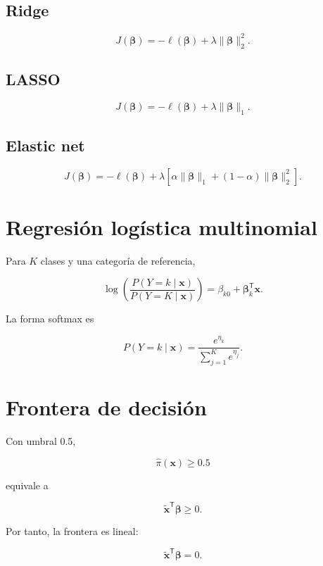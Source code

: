 \documentclass[
  spanish,
  11pt,
  letterpaper,
  DIV=11,
  numbers=noendperiod]{scrreprt}
\theoremstyle{definition}
\theoremstyle{plain}
\theoremstyle{definition}
\theoremstyle{remark}
\begin{document}
\subsection{Ridge}\label{ridge}

\[
J(\boldsymbol{\beta})
=
-\ell(\boldsymbol{\beta})
+
\lambda
\|\boldsymbol{\beta}\|_2^2.
\]

\subsection{LASSO}\label{lasso-1}

\[
J(\boldsymbol{\beta})
=
-\ell(\boldsymbol{\beta})
+
\lambda
\|\boldsymbol{\beta}\|_1.
\]

\subsection{Elastic net}\label{elastic-net-1}

\[
J(\boldsymbol{\beta})
=
-\ell(\boldsymbol{\beta})
+
\lambda
\left[
\alpha
\|\boldsymbol{\beta}\|_1
+
(1-\alpha)
\|\boldsymbol{\beta}\|_2^2
\right].
\]

\section{Regresión logística
multinomial}\label{regresiuxf3n-loguxedstica-multinomial}

Para \(K\) clases y una categoría de referencia,

\[
\log
\left(
\frac{
P(Y=k\mid\mathbf{x})
}{
P(Y=K\mid\mathbf{x})
}
\right)
=
\beta_{k0}
+
\boldsymbol{\beta}_k^{\mathsf T}\mathbf{x}.
\]

La forma softmax es

\[
P(Y=k\mid\mathbf{x})
=
\frac{
e^{\eta_k}
}{
\sum_{j=1}^{K}e^{\eta_j}
}.
\]

\section{Frontera de decisión}\label{frontera-de-decisiuxf3n-1}

Con umbral 0.5,

\[
\widehat{\pi}(\mathbf{x})\geq 0.5
\]

equivale a

\[
\widetilde{\mathbf{x}}^{\mathsf T}\boldsymbol{\beta}\geq 0.
\]

Por tanto, la frontera es lineal:

\[
\widetilde{\mathbf{x}}^{\mathsf T}\boldsymbol{\beta}=0.
\]
\end{document}
